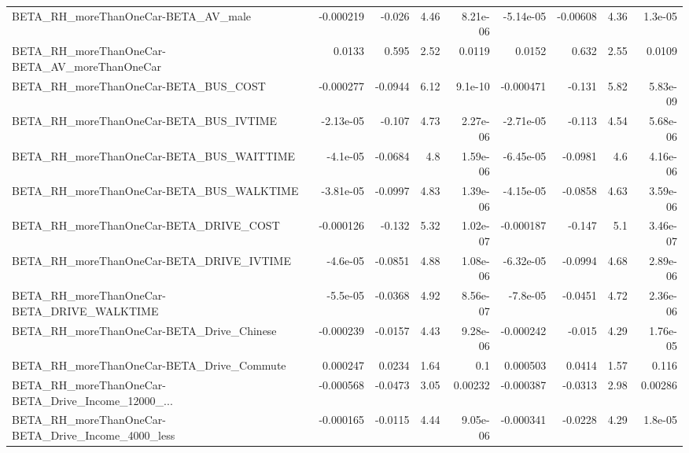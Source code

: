 \begin{tabular}{lrrrrrrrr}
BETA\_RH\_moreThanOneCar-BETA\_AV\_male                &   -0.000219 &       -0.026 &      4.46 & 8.21e-06 &  -5.14e-05 &    -0.00608 &         4.36 &       1.3e-05 \\
BETA\_RH\_moreThanOneCar-BETA\_AV\_moreThanOneCar      &      0.0133 &        0.595 &      2.52 &   0.0119 &     0.0152 &       0.632 &         2.55 &        0.0109 \\
BETA\_RH\_moreThanOneCar-BETA\_BUS\_COST               &   -0.000277 &      -0.0944 &      6.12 &  9.1e-10 &  -0.000471 &      -0.131 &         5.82 &      5.83e-09 \\
BETA\_RH\_moreThanOneCar-BETA\_BUS\_IVTIME             &   -2.13e-05 &       -0.107 &      4.73 & 2.27e-06 &  -2.71e-05 &      -0.113 &         4.54 &      5.68e-06 \\
BETA\_RH\_moreThanOneCar-BETA\_BUS\_WAITTIME           &    -4.1e-05 &      -0.0684 &       4.8 & 1.59e-06 &  -6.45e-05 &     -0.0981 &          4.6 &      4.16e-06 \\
BETA\_RH\_moreThanOneCar-BETA\_BUS\_WALKTIME           &   -3.81e-05 &      -0.0997 &      4.83 & 1.39e-06 &  -4.15e-05 &     -0.0858 &         4.63 &      3.59e-06 \\
BETA\_RH\_moreThanOneCar-BETA\_DRIVE\_COST             &   -0.000126 &       -0.132 &      5.32 & 1.02e-07 &  -0.000187 &      -0.147 &          5.1 &      3.46e-07 \\
BETA\_RH\_moreThanOneCar-BETA\_DRIVE\_IVTIME           &    -4.6e-05 &      -0.0851 &      4.88 & 1.08e-06 &  -6.32e-05 &     -0.0994 &         4.68 &      2.89e-06 \\
BETA\_RH\_moreThanOneCar-BETA\_DRIVE\_WALKTIME         &    -5.5e-05 &      -0.0368 &      4.92 & 8.56e-07 &   -7.8e-05 &     -0.0451 &         4.72 &      2.36e-06 \\
BETA\_RH\_moreThanOneCar-BETA\_Drive\_Chinese          &   -0.000239 &      -0.0157 &      4.43 & 9.28e-06 &  -0.000242 &      -0.015 &         4.29 &      1.76e-05 \\
BETA\_RH\_moreThanOneCar-BETA\_Drive\_Commute          &    0.000247 &       0.0234 &      1.64 &      0.1 &   0.000503 &      0.0414 &         1.57 &         0.116 \\
BETA\_RH\_moreThanOneCar-BETA\_Drive\_Income\_12000\_... &   -0.000568 &      -0.0473 &      3.05 &  0.00232 &  -0.000387 &     -0.0313 &         2.98 &       0.00286 \\
BETA\_RH\_moreThanOneCar-BETA\_Drive\_Income\_4000\_less &   -0.000165 &      -0.0115 &      4.44 & 9.05e-06 &  -0.000341 &     -0.0228 &         4.29 &       1.8e-05 \\

\end{tabular}
